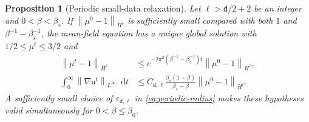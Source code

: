 \documentclass[11pt,reqno]{amsart}
\numberwithin{equation}{section}
\newtheorem{proposition}[proposition]{Proposition}
\theoremstyle{definition}
\theoremstyle{remark}
\renewcommand{\d}{\mathsf d}
\renewcommand{\u}{\mathsf u}
\newcommand{\dd}{\mathop{}\!\mathrm d}
\newcommand{\norm}[1]{\left\lVert#1\right\rVert}
\begin{document}
\begin{proposition}[Periodic small-data relaxation]\label{prop:periodic-relaxation}
Let $\ell>\d/2+2$ be an integer and $0<\beta<\beta_s$. If $\norm{\mu^0-1}_{H^\ell}$ is sufficiently small compared with both $1$ and $\beta^{-1}-\beta_s^{-1}$, the mean-field equation has a unique global solution with $1/2\leq\mu^t\leq3/2$ and
\begin{align}
 \norm{\mu^t-1}_{H^\ell}
 &\leq e^{-2\pi^2(\beta^{-1}-\beta_s^{-1})t}
                    \norm{\mu^0-1}_{H^\ell},\label{eq:periodic-decay}\\
 \int_0^\infty\norm{\nabla \u^t}_{L^\infty}\dd t
 &\leq C_{\d,\ell}\frac{\beta_s(1+\beta)}{\beta_s-\beta}
                        \norm{\mu^0-1}_{H^\ell}.
 \label{eq:periodic-integrated-velocity}
\end{align}
A sufficiently small choice of $\varepsilon_{\d,\ell}$ in \eqref{eq:periodic-radius} makes these hypotheses valid simultaneously for $0<\beta\leq\beta_0$.
\end{proposition}
\end{document}
